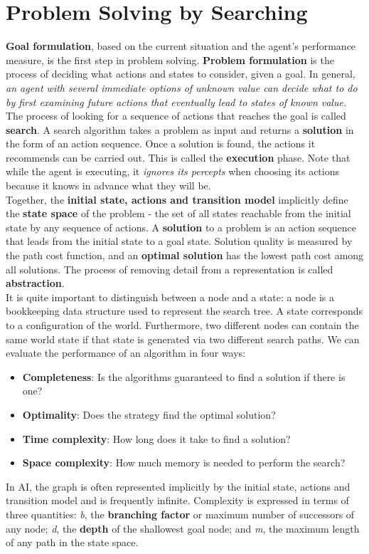 \documentclass[twoside]{article}
\begin{document}
\section{Problem Solving by Searching}

\textbf{Goal formulation}, based on the current situation and the agent's
performance measure, is the first step in problem solving. \textbf{Problem 
formulation} is the process of deciding what actions and states to consider,
given a goal. In general, \emph{an agent with several immediate options of 
unknown value can decide what to do by first examining future actions that 
eventually lead to states of known value.} The process of looking for a 
sequence of actions that reaches the goal is called \textbf{search}. A search
algorithm takes a problem as input and returns a \textbf{solution} in the 
form of an action sequence. Once a solution is found, the actions it recommends
can be carried out. This is called the \textbf{execution} phase. Note that while
the agent is executing, it \emph{ignores its percepts} when choosing its actions
because it knows in advance what they will be.\\

Together, the \textbf{initial state, actions and transition model} implicitly
define the \textbf{state space} of the problem - the set of all states
reachable from the initial state by any sequence of actions. A \textbf{solution}
to a problem is an action sequence that leads from the initial state to a goal
state. Solution quality is measured by the path cost function, and an \textbf{
optimal solution} has the lowest path cost among all solutions. The process 
of removing detail from a representation is called \textbf{abstraction}.\\

It is quite important to distinguish between a node and a state: a node is a 
bookkeeping data structure used to represent the search tree. A state 
corresponds to a configuration of the world. Furthermore, two different nodes
can contain the same world state if that state is generated via two different
search paths. We can evaluate the performance of an algorithm in four ways:
\begin{itemize}
    \item \textbf{Completeness}: Is the algorithms guaranteed to find a solution
    if there is one?
    \item \textbf{Optimality}: Does the strategy find the optimal solution?
    \item \textbf{Time complexity}: How long does it take to find a solution?
    \item \textbf{Space complexity}: How much memory is needed to perform the
    search?
\end{itemize}
In AI, the graph is often represented implicitly by the initial state, actions
and transition model and is frequently infinite. Complexity is expressed in
terms of three quantities: \emph{b}, the \textbf{branching factor} or maximum
number of successors of any node; \emph{d}, the \textbf{depth} of the shallowest
goal node; and \emph{m}, the maximum length of any path in the state space.
\end{document}
